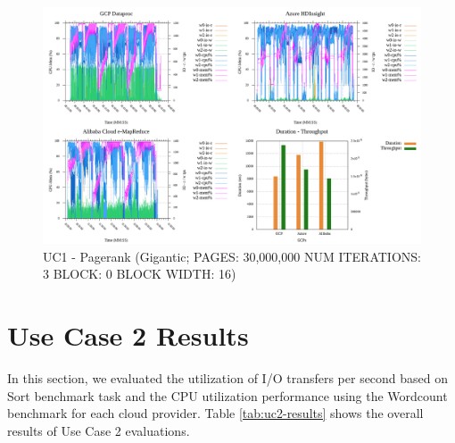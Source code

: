 \documentclass[review]{elsarticle}
\begin{document}
\begin{figure}[p]
	\caption{UC1 - Pagerank (Gigantic; PAGES: 30,000,000 NUM ITERATIONS: 3 BLOCK: 0 BLOCK WIDTH: 16)}
	\label{fig:uc1-page-g-cmidt}
	\includegraphics[width=\textwidth]{uc1-page-g-cmidt}
	\centering
\end{figure}



\section{Use Case 2 Results}
In this section, we evaluated the utilization of I/O transfers per second based on Sort benchmark task and the CPU utilization performance using the Wordcount benchmark for each cloud provider. Table \ref{tab:uc2-results} shows the overall results of Use Case 2 evaluations.
\end{document}
